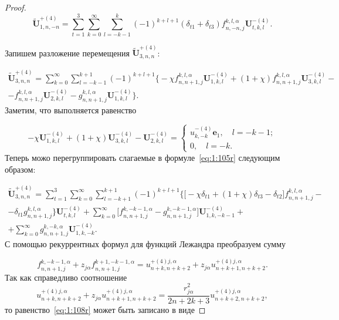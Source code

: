 \begin{proof}
\begin{equation}
\mathbf{\tilde U}_{1,n,-n}^{+(4)}=\sum\limits_{t=1}^3\sum\limits_{k=0}^\infty\sum\limits_{l=-k-1}^{k}(-1)^{k+l+1}(\delta_{t1}+\delta_{t3}){f}_{n,-n,j}^{k,l,\alpha}\mathbf{U}_{t,k,l}^{-(4)}.
\label{eq:1:104r}
\end{equation}

Запишем разложение перемещения $\mathbf{\tilde U}_{3,n,n}^{+(4)}$:

\begin{multline}\label{eq:1:105r}
\mathbf{\tilde U}_{3,n,n}^{+(4)}=\sum\limits_{k=0}^\infty\sum\limits_{l=-k-1}^{k+1}(-1)^{k+l+1}\bigg\{-\chi{f}_{n,n+1,j}^{k,l,\alpha}\mathbf{U}_{1,k,l}^{-(4)}+(1+\chi){f}_{n,n+1,j}^{k,l,\alpha}\mathbf{U}_{3,k,l}^{-(4)}- \\
-{f}_{n,n+1,j}^{k,l,\alpha}\mathbf{U}_{2,k,l}^{-(4)}-{g}_{n,n+1,j}^{k,l,\alpha}\mathbf{U}_{1,k,l}^{-(4)}\bigg\}.
\end{multline}
Заметим, что выполняется равенство

\begin{equation}
-\chi\mathbf{U}_{1,k,l}^{-(4)}+(1+\chi)\mathbf{U}_{3,k,l}^{-(4)}-
\mathbf{U}_{2,k,l}^{-(4)}=
\begin{cases}
u_{k,-k}^{-(4)}\mathbf{e}_1,\quad l=-k-1; \\
0,\quad l=-k.
\end{cases}
\label{eq:1:106r}
\end{equation}
Теперь можо перегруппировать слагаемые в формуле~\eqref{eq:1:105r} следующим образом:

\begin{multline}\label{eq:1:107r}
\mathbf{\tilde U}_{3,n,n}^{+(4)}=\sum\limits_{t=1}^3\sum\limits_{k=0}^\infty\sum\limits_{l=-k+1}^{k+1}(-1)^{k+l+1}\bigg\{\bigg\lbrack-\chi\delta_{t1}+(1+\chi)\delta_{t3}-
\delta_{t2}\bigg\rbrack{f}_{n,n+1,j}^{k,l,\alpha}- \\
-\delta_{t1}{g}_{n,n+1,j}^{k,l,\alpha}\bigg\}\mathbf{U}_{t,k,l}^{-(4)}+\sum\limits_{k=0}^\infty\bigg\lbrack
{f}_{n,n+1,j}^{k,-k-1,\alpha}-{g}_{n,n+1,j}^{k,-k-1,\alpha}\bigg\rbrack\mathbf{U}_{1,k,-k-1}^{-(4)}+ \\
+\sum\limits_{k=0}^\infty{g}_{n,n+1,j}^{k,-k,\alpha}\mathbf{U}_{1,k,-k}^{-(4)}.
\end{multline}
С помощью рекуррентных формул для функций Лежандра преобразуем сумму

\begin{equation}
{f}_{n,n+1,j}^{k,-k-1,\alpha}+z_{j\alpha}{f}_{n,n+1,j}^{k+1,-k-1,\alpha}={u}_{n+k,n+k+2}^{+(4)j,\alpha}+z_{j\alpha}{u}_{n+k+1,n+k+2}^{+(4)j,\alpha}.
\label{eq:1:108r}
\end{equation}
Так как справедливо соотношение
$$
{u}_{n+k,n+k+2}^{ + (4)j,\alpha}+z_{j\alpha}{u}_{n+k+1,n+k+2}^{+(4)j,\alpha}=\frac{r_{j\alpha}^2}{2n+2k+3}u_{n+k+2,n+k+2}^{+(4)j,\alpha},
$$
то равенство~\eqref{eq:1:108r} может быть записано в виде


\end{proof}
